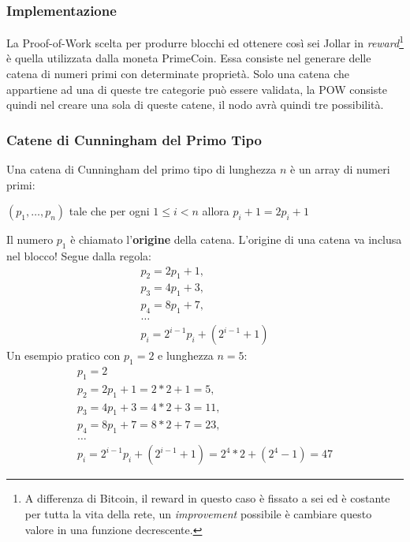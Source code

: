 \subsubsection{Implementazione}
La Proof-of-Work scelta per produrre blocchi ed ottenere così sei Jollar in \textit{reward}\footnote{A differenza di Bitcoin, il reward in questo caso è fissato a sei ed è costante per tutta la vita della rete, un \textit{improvement} possibile è cambiare questo valore in una funzione decrescente.} è quella utilizzata dalla moneta PrimeCoin. Essa consiste nel generare delle catena di numeri primi con determinate proprietà. Solo una catena che appartiene ad una di queste tre categorie può essere validata, la POW consiste quindi nel creare una sola di queste catene, il nodo avrà quindi tre possibilità.

\subsubsection*{Catene di Cunningham del Primo Tipo}
Una catena di Cunningham del primo tipo di lunghezza $n$ è un array di numeri primi:
\begin{center}
    $(p_1, \dots, p_n)$ tale che per ogni $1 \leq i < n$ allora $p_i+1 = 2p_i + 1$
\end{center}
Il numero $p_1$ è chiamato l'\textbf{origine} della catena. L'origine di una catena va inclusa nel blocco! Segue dalla regola:
\begin{equation}
\begin{split}
p_2 = 2p_1 + 1, \\
p_3 = 4p_1 + 3, \\
p_4 = 8p_1 + 7, \\
\dots \\
p_i = 2^{i-1}p_i + ( 2^{i-1} + 1 )
\end{split}
\end{equation}
Un esempio pratico con $p_1 = 2$ e lunghezza $n = 5$:
\begin{equation}
\begin{split}
p_1 = 2 \\
p_2 = 2p_1 + 1 = 2*2 + 1 = 5, \\
p_3 = 4p_1 + 3 = 4*2 + 3 = 11, \\
p_4 = 8p_1 + 7 = 8*2 + 7 = 23, \\
\dots \\
p_i = 2^{i-1}p_i + ( 2^{i-1} + 1 ) = 2^4 * 2 + ( 2^4 -1 ) = 47
\end{split}
\end{equation}

